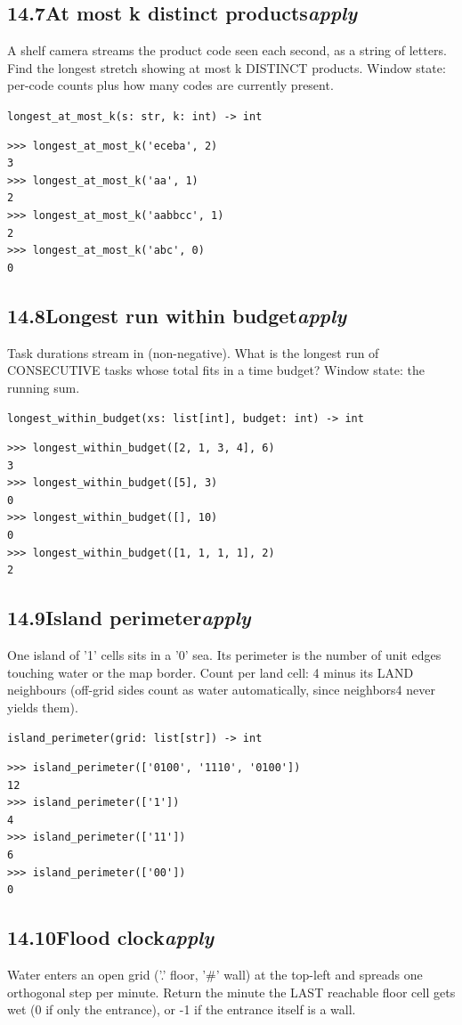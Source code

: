 \documentclass[10pt,letterpaper]{book}
\begin{document}
\subsection*{14.7\quad At most k distinct products\hfill\textnormal{\textit{apply}}}
A shelf camera streams the product code seen each second, as a string of letters. Find the longest stretch showing at most k DISTINCT products. Window state: per-code counts plus how many codes are currently present.

\noindent\texttt{longest\_at\_most\_k(s: str, k: int) -> int}
\begin{lstlisting}[style=ex]
>>> longest_at_most_k('eceba', 2)
3
>>> longest_at_most_k('aa', 1)
2
>>> longest_at_most_k('aabbcc', 1)
2
>>> longest_at_most_k('abc', 0)
0
\end{lstlisting}
\subsection*{14.8\quad Longest run within budget\hfill\textnormal{\textit{apply}}}
Task durations stream in (non-negative). What is the longest run of CONSECUTIVE tasks whose total fits in a time budget? Window state: the running sum.

\noindent\texttt{longest\_within\_budget(xs: list[int], budget: int) -> int}
\begin{lstlisting}[style=ex]
>>> longest_within_budget([2, 1, 3, 4], 6)
3
>>> longest_within_budget([5], 3)
0
>>> longest_within_budget([], 10)
0
>>> longest_within_budget([1, 1, 1, 1], 2)
2
\end{lstlisting}
\subsection*{14.9\quad Island perimeter\hfill\textnormal{\textit{apply}}}
One island of '1' cells sits in a '0' sea. Its perimeter is the number of unit edges touching water or the map border. Count per land cell: 4 minus its LAND neighbours (off-grid sides count as water automatically, since neighbors4 never yields them).

\noindent\texttt{island\_perimeter(grid: list[str]) -> int}
\begin{lstlisting}[style=ex]
>>> island_perimeter(['0100', '1110', '0100'])
12
>>> island_perimeter(['1'])
4
>>> island_perimeter(['11'])
6
>>> island_perimeter(['00'])
0
\end{lstlisting}
\subsection*{14.10\quad Flood clock\hfill\textnormal{\textit{apply}}}
Water enters an open grid ('.' floor, '\#' wall) at the top-left and spreads one orthogonal step per minute. Return the minute the LAST reachable floor cell gets wet (0 if only the entrance), or -1 if the entrance itself is a wall.
\end{document}
